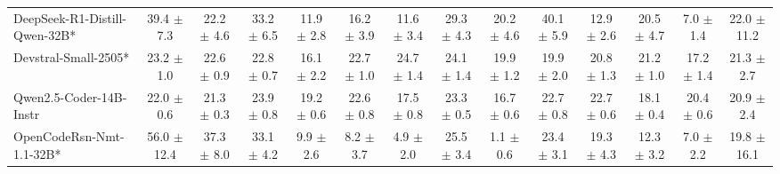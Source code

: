 \begin{table}[t]
{\begin{tabular}{l *{13}{c}}
\rowcolor{gray!10}
 DeepSeek-R1-Distill-Qwen-32B* &
39.4 {\tiny$\pm$ 7.3} & 
22.2 {\tiny$\pm$ 4.6} & 
33.2 {\tiny$\pm$ 6.5} & 
11.9 {\tiny$\pm$ 2.8} &
16.2 {\tiny$\pm$ 3.9} & 
11.6 {\tiny$\pm$ 3.4} & 
29.3 {\tiny$\pm$ 4.3} & 
20.2 {\tiny$\pm$ 4.6} &
40.1 {\tiny$\pm$ 5.9} & 
12.9 {\tiny$\pm$ 2.6} & 
20.5 {\tiny$\pm$ 4.7} & 
7.0 {\tiny$\pm$ 1.4} &
22.0 {\tiny$\pm$ 11.2} \\



 Devstral-Small-2505* &
23.2 {\tiny$\pm$ 1.0} & 
22.6 {\tiny$\pm$ 0.9} & 
22.8 {\tiny$\pm$ 0.7} & 
16.1 {\tiny$\pm$ 2.2} &
22.7 {\tiny$\pm$ 1.0} & 
24.7 {\tiny$\pm$ 1.4} & 
24.1 {\tiny$\pm$ 1.4} & 
19.9 {\tiny$\pm$ 1.2} &
19.9 {\tiny$\pm$ 2.0} & 
20.8 {\tiny$\pm$ 1.3} & 
21.2 {\tiny$\pm$ 1.0} & 
17.2 {\tiny$\pm$ 1.4} &
21.3 {\tiny$\pm$ 2.7} \\


\rowcolor{gray!10}
Qwen2.5-Coder-14B-Instr 
 & 22.0 {\tiny$\pm$ 0.6} & 
 21.3 {\tiny$\pm$ 0.3} & 
 23.9 {\tiny$\pm$ 0.8} & 
 19.2 {\tiny$\pm$ 0.6} & 
 22.6 {\tiny$\pm$ 0.8} & 
 17.5 {\tiny$\pm$ 0.8} & 
 23.3 {\tiny$\pm$ 0.5} & 
 16.7 {\tiny$\pm$ 0.6} & 
 22.7 {\tiny$\pm$ 0.8} & 
 22.7 {\tiny$\pm$ 0.6} & 
 18.1 {\tiny$\pm$ 0.4} & 
 20.4 {\tiny$\pm$ 0.6} & 
 20.9 {\tiny$\pm$ 2.4} \\


 OpenCodeRsn-Nmt-1.1-32B* &
56.0 {\tiny$\pm$ 12.4} & 
37.3 {\tiny$\pm$ 8.0} & 
33.1 {\tiny$\pm$ 4.2} & 
9.9 {\tiny$\pm$ 2.6} &
8.2 {\tiny$\pm$ 3.7} & 
4.9 {\tiny$\pm$ 2.0} & 
25.5 {\tiny$\pm$ 3.4} & 
1.1 {\tiny$\pm$ 0.6} &
23.4 {\tiny$\pm$ 3.1} & 
19.3 {\tiny$\pm$ 4.3} & 
12.3 {\tiny$\pm$ 3.2} & 
7.0 {\tiny$\pm$ 2.2} &
19.8 {\tiny$\pm$ 16.1} \\



\end{tabular}}
\end{table}
